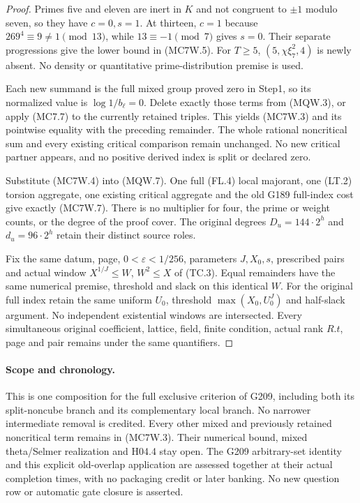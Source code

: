 \begin{proof}
Primes five and eleven are inert in $K$ and not congruent to
$\pm1$ modulo seven, so they have $c=0,s=1$.
At thirteen, $c=1$ because $269^4\equiv9\ne1\pmod{13}$,
while $13\equiv-1\pmod7$ gives $s=0$.
Their separate progressions give the lower bound in (MC7W.5).
For $T\geq5$, $(5,\chi\xi_7^2,4)$ is newly absent.
No density or quantitative prime-distribution premise is used.

Each new summand is the full mixed group proved zero in Step1,
so its normalized value is $\log1/b_\ell=0$.
Delete exactly those terms from (MQW.3), or apply (MC7.7)
to the currently retained triples. This yields (MC7W.3)
and its pointwise equality with the preceding remainder.
The whole rational noncritical sum and every existing critical
comparison remain unchanged. No new critical partner appears,
and no positive derived index is split or declared zero.

Substitute (MC7W.4) into (MQW.7).
One full (FL.4) local majorant, one (LT.2) torsion aggregate,
one existing critical aggregate and the old G189 full-index
cost give exactly (MC7W.7). There is no multiplier for four,
the prime or weight counts, or the degree of the proof cover.
The original degrees $D_u=144\cdot2^h$ and $d_u=96\cdot2^h$
retain their distinct source roles.

Fix the same datum, page, $0<\varepsilon<1/256$,
parameters $J,X_0,s$, prescribed pairs and actual window
$X^{1/J}\leq W$, $W^2\leq X$ of (TC.3).
Equal remainders have the same numerical premise, threshold
and slack on this identical $W$. For the original full index
retain the same uniform $U_0$, threshold $\max(X_0,U_0^J)$
and half-slack argument. No independent existential windows
are intersected. Every simultaneous original coefficient,
lattice, field, finite condition, actual rank $R.t$, page
and pair remains under the same quantifiers.
\end{proof}

\paragraph{Scope and chronology.}
This is one composition for the full exclusive criterion of G209,
including both its split-noncube branch and its complementary
local branch. No narrower intermediate removal is credited.
Every other mixed and previously retained noncritical term remains
in (MC7W.3). Their numerical bound, mixed theta/Selmer realization
and H04.4 stay open. The G209 arbitrary-set identity and this
explicit old-overlap application are assessed together at their
actual completion times, with no packaging credit or later banking.
No new question row or automatic gate closure is asserted.
